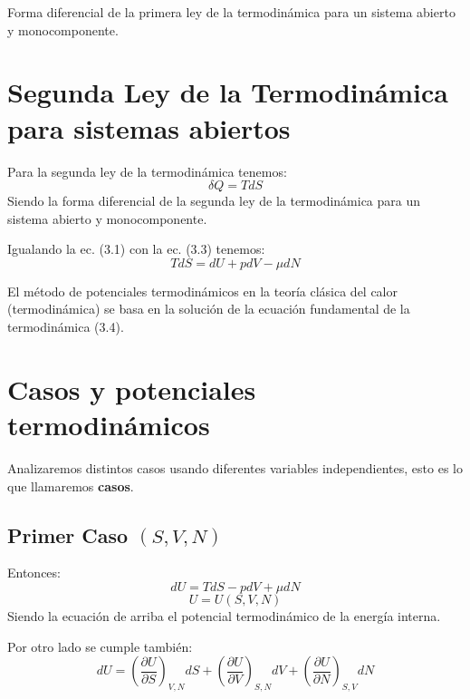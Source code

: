 Forma diferencial de la primera ley de la termodinámica para un sistema abierto y monocomponente.

\section{Segunda Ley de la Termodinámica para sistemas abiertos}

Para la segunda ley de la termodinámica tenemos:
\begin{equation}
    \delta Q = TdS \tag{3.3}
\end{equation}
Siendo la forma diferencial de la segunda ley de la termodinámica para un sistema abierto y monocomponente.

Igualando la ec. (3.1) con la ec. (3.3) tenemos:
\begin{equation}
    TdS = dU + pdV - \mu dN \tag{3.4}
\end{equation}

El método de potenciales termodinámicos en la teoría clásica del calor (termodinámica) se basa en la solución de la ecuación fundamental de la termodinámica (3.4).

\section{Casos y potenciales termodinámicos}

Analizaremos distintos casos usando diferentes variables independientes, esto es lo que llamaremos \textbf{casos}.

\subsection{Primer Caso $(S,V,N)$}

Entonces:
\begin{equation}
    dU = TdS - pdV + \mu dN \tag{3.5}
\end{equation}
\begin{equation}
    U = U(S,V,N) \tag{3.6}
\end{equation}
Siendo la ecuación de arriba el potencial termodinámico de la energía interna.

Por otro lado se cumple también:
\begin{equation}
    dU = 
    \left( \frac{\partial U}{\partial S} \right)_{V,N} dS +
    \left( \frac{\partial U}{\partial V} \right)_{S,N} dV +
    \left( \frac{\partial U}{\partial N} \right)_{S,V} dN \tag{3.7}
\end{equation}

